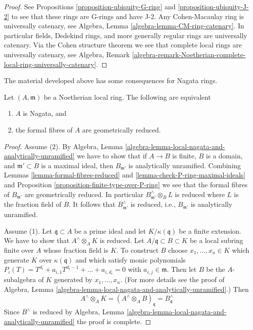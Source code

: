 \begin{proof}
See Propositions \ref{proposition-ubiquity-G-ring} and
\ref{proposition-ubiquity-J-2} to see that these rings are
G-rings and have J-2. Any Cohen-Macaulay ring is universally
catenary, see Algebra, Lemma \ref{algebra-lemma-CM-ring-catenary}.
In particular fields, Dedekind rings, and more generally
regular rings are universally catenary. Via the Cohen structure theorem 
we see that complete local rings are universally catenary, see
Algebra, Remark
\ref{algebra-remark-Noetherian-complete-local-ring-universally-catenary}.
\end{proof}

\noindent
The material developed above has some consequences for Nagata rings.

\begin{lemma}
\label{lemma-Nagata-local-ring}
Let $(A, \mathfrak m)$ be a Noetherian local ring.
The following are equivalent
\begin{enumerate}
\item $A$ is Nagata, and
\item the formal fibres of $A$ are geometrically reduced.
\end{enumerate}
\end{lemma}

\begin{proof}
Assume (2). By
Algebra, Lemma \ref{algebra-lemma-local-nagata-and-analytically-unramified}
we have to show that if $A \to B$ is finite, $B$ is a domain,
and $\mathfrak m' \subset B$ is a maximal ideal, then $B_{\mathfrak m'}$
is analytically unramified.
Combining Lemmas \ref{lemma-formal-fibres-reduced} and
\ref{lemma-check-P-ring-maximal-ideals} and
Proposition \ref{proposition-finite-type-over-P-ring}
we see that the formal fibres of $B_{\mathfrak m'}$ are
geometrically reduced. In particular
$B_{\mathfrak m'}^\wedge \otimes_B L$ is reduced
where $L$ is the fraction field of $B$.
It follows that $B_{\mathfrak m'}^\wedge$ is reduced, i.e.,
$B_{\mathfrak m'}$ is analytically unramified.

\medskip\noindent
Assume (1). Let $\mathfrak q \subset A$ be a prime ideal
and let $K/\kappa(\mathfrak q)$ be a finite extension.
We have to show that $A^\wedge \otimes_A K$ is reduced.
Let $A/\mathfrak q \subset B \subset K$ be a local subring
finite over $A$ whose fraction field is $K$.
To construct $B$ choose $x_1, \ldots, x_n \in K$
which generate $K$ over $\kappa(\mathfrak q)$
and which satisfy monic polynomials
$P_i(T) = T^{d_i} + a_{i, 1} T^{d_i - 1} + \ldots + a_{i, d_i} = 0$
with $a_{i, j} \in \mathfrak m$. Then let $B$ be the $A$-subalgebra
of $K$ generated by $x_1, \ldots, x_n$. (For more details see
the proof of Algebra, Lemma
\ref{algebra-lemma-local-nagata-and-analytically-unramified}.)
Then
$$
A^\wedge \otimes_A K =
(A^\wedge \otimes_A B)_\mathfrak q =
B^\wedge_\mathfrak q
$$
Since $B^\wedge$ is reduced by  Algebra, Lemma
\ref{algebra-lemma-local-nagata-and-analytically-unramified}
the proof is complete.
\end{proof}


